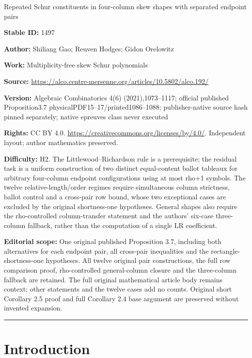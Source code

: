 \documentclass[10pt]{article}
\theoremstyle{definition}
\begin{document}
\begin{center}\Large Repeated Schur constituents in four-column skew shapes with separated endpoint pairs\end{center}
\noindent\textbf{Stable ID:} 1497\par
\noindent\textbf{Author:} Shiliang Gao; Reuven Hodges; Gidon Orelowitz\par
\noindent\textbf{Work:} Multiplicity-free skew Schur polynomials\par
\noindent\textbf{Source:} \url{https://alco.centre-mersenne.org/articles/10.5802/alco.192/}\par
\noindent\textbf{Version:} Algebraic Combinatorics 4(6) (2021),1073--1117; official published Proposition3.7 physicalPDF15--17/printed1086--1088; publisher-native source hash pinned separately; native epreuves class never executed\par
\noindent\textbf{Rights:} CC BY 4.0. \url{https://creativecommons.org/licenses/by/4.0/}. Independent layout; author mathematics preserved.\par
\noindent\textbf{Difficulty:} H2. The Littlewood--Richardson rule is a prerequisite; the residual task is a uniform construction of two distinct equal-content ballot tableaux for arbitrary four-column endpoint configurations using at most rho+1 symbols. The twelve relative-length/order regimes require simultaneous column strictness, ballot control and a cross-pair row bound, whose two exceptional cases are excluded by the original shortness-one hypotheses. General shapes also require the rho-controlled column-transfer statement and the authors' six-case three-column fallback, rather than the computation of a single LR coefficient.\par
\noindent\textbf{Editorial scope:} One original published Proposition 3.7, including both alternatives for each endpoint pair, all cross-pair inequalities and the rectangle-shortness-one hypotheses. All twelve original pair constructions, the full row comparison proof, rho-controlled general-column closure and the three-column fallback are retained. The full original mathematical article body remains context; other statements and the twelve cases add no counts. Original short Corollary 2.5 proof and full Corollary 2.4 base argument are preserved without invented expansion.\par
\medskip\hrule\medskip
\section{Introduction}\label{sec:intro}
\end{document}
